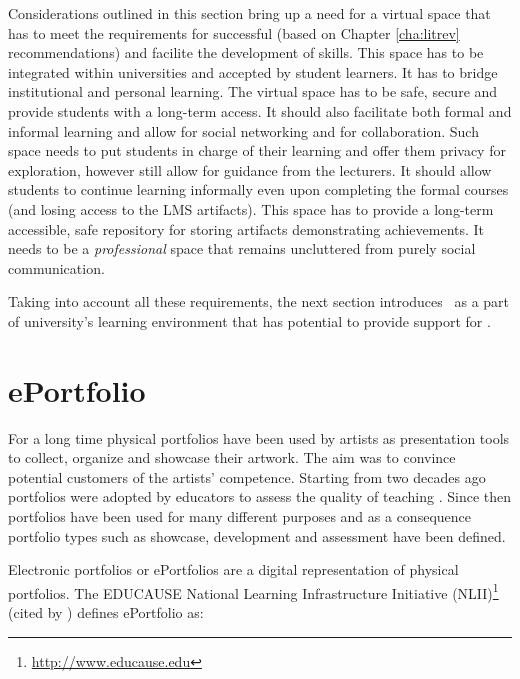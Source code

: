 Considerations outlined in this section bring up a need for a virtual space that
has to meet the requirements for successful \LLLs (based on Chapter
\ref{cha:litrev} recommendations) and facilite the development of \LLLs skills.
This space has to be integrated within universities and accepted by student
learners. It has to bridge institutional and personal learning. The virtual
space has to be safe, secure and provide students with a long-term access. It
should also facilitate both formal and informal learning and allow for social
networking and for collaboration. Such space needs to put students in charge of
their learning and offer them privacy for exploration, however still allow
for guidance from the lecturers. It should allow students to continue learning
informally even upon completing the formal courses (and losing access to the
LMS artifacts). This space has to provide a long-term accessible, safe
repository for storing artifacts demonstrating achievements. It needs to be a
\textit{professional} space that remains uncluttered from purely social
communication.

Taking into account all these requirements, the next section introduces \ep~as a
part of university's learning environment that has potential to provide support
for \LLLsn.

\section{ePortfolio}
For a long time physical portfolios have been used by artists as presentation
tools to collect, organize and showcase their artwork. The aim was to convince
potential customers of the artists' competence. Starting from two decades ago
portfolios were adopted by educators to assess the quality of teaching
\citep{VanTartwijkJ.2004}. Since then portfolios have been used for many
different purposes and as a consequence portfolio types such as showcase,
development and assessment have been defined.
 
Electronic portfolios or ePortfolios are a digital representation of physical
portfolios. The EDUCAUSE National Learning Infrastructure Initiative
(NLII)\footnote{\url{http://www.educause.edu}} (cited by
\citealp{IMSGlobalLearningConsortium2005}) defines ePortfolio as:


